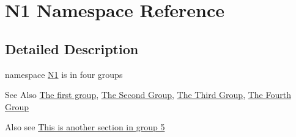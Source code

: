 \hypertarget{namespace_n1}{\section{N1 Namespace Reference}
\label{namespace_n1}
}


\subsection{Detailed Description}
namespace \hyperlink{namespace_n1}{N1} is in four groups \begin{DoxySeeAlso}{See Also}
\hyperlink{group__group1}{The first group}, \hyperlink{group__group2}{The Second Group}, \hyperlink{group__group3}{The Third Group}, \hyperlink{group__group4}{The Fourth Group}
\end{DoxySeeAlso}
Also see \hyperlink{group__group5}{This is another section in group 5} 